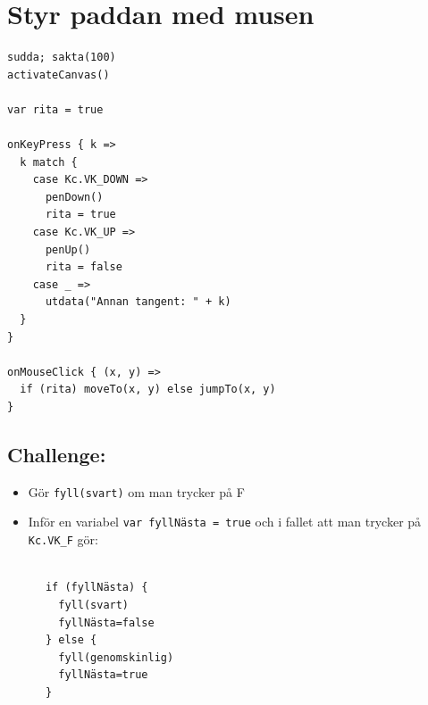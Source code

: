 \chapter{Styr paddan med musen}
\begin{multicols}{2}

\begin{lstlisting}[basicstyle={\ttfamily\fontsize{16}{19}\selectfont},numbers=none]
sudda; sakta(100)
activateCanvas()

var rita = true

onKeyPress { k =>
  k match {
    case Kc.VK_DOWN => 
      penDown()
      rita = true
    case Kc.VK_UP => 
      penUp()
      rita = false
    case _ => 
      utdata("Annan tangent: " + k)
  }
}

onMouseClick { (x, y) =>
  if (rita) moveTo(x, y) else jumpTo(x, y)
}
\end{lstlisting}
        


\columnbreak


\section*{\color{BrickRed}Challenge:}


\begin{itemize}

\item {Gör \lstinline{fyll(svart)} om man trycker på F}
\item {Inför en variabel \lstinline{var fyllNästa = true} och i fallet att man trycker på \lstinline{Kc.VK_F} gör:}

\end{itemize}



\begin{lstlisting}[numbers=none]

      if (fyllNästa) {
        fyll(svart)
        fyllNästa=false
      } else {
        fyll(genomskinlig)
        fyllNästa=true
      }
      
\end{lstlisting}
        
\end{multicols}

